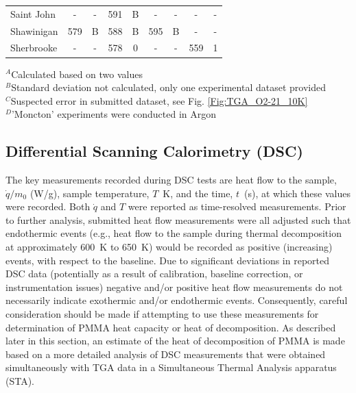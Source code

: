 \documentclass{book}
\begin{document}
\begin{table}[p]
\begin{center}
\begin{tabular}{|l|cc|cc|cc|cc|}
Saint John              & -           & -               & 591            & B                & -          & -                 & -           & -                     \\
Shawinigan              & 579         & B               & 588            & B                & 595        & B                 & -           & -                     \\
Sherbrooke              & -           & -               & 578            & 0                & -          & -                 & 559         & 1                     \\  \hline
\end{tabular}
\end{center}
$^A$Calculated based on two values \\
$^B$Standard deviation not calculated, only one experimental dataset provided \\
$^C$Suspected error in submitted dataset, see Fig. \ref{Fig:TGA_O2-21_10K} \\
$^D$'Moncton' experiments were conducted in Argon
\end{table}


\newpage
\subsection{Differential Scanning Calorimetry (DSC)}

The key measurements recorded during DSC tests are heat flow to the sample, $\dot{q}/m_0$ (W/g), sample temperature, $T$~K, and the time, $t$~(s), at which these values were recorded.  Both $\dot{q}$ and $T$ were reported as time-resolved measurements. Prior to further analysis, submitted heat flow measurements were all adjusted such that endothermic events (e.g., heat flow to the sample during thermal decomposition at approximately 600~K to 650~K) would be recorded as positive (increasing) events, with respect to the baseline. Due to significant deviations in reported DSC data (potentially as a result of calibration, baseline correction, or instrumentation issues) negative and/or positive heat flow measurements do not necessarily indicate exothermic and/or endothermic events. Consequently, careful consideration should be made if attempting to use these measurements for determination of PMMA heat capacity or heat of decomposition. As described later in this section, an estimate of the heat of decomposition of PMMA is made based on a more detailed analysis of DSC measurements that were obtained simultaneously with TGA data in a Simultaneous Thermal Analysis apparatus (STA).
\end{document}
